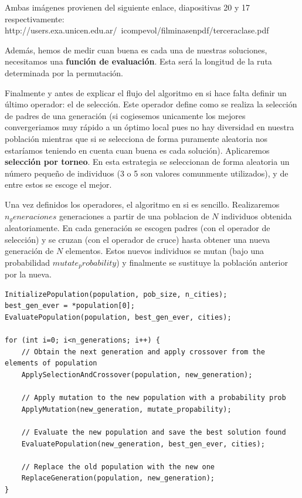 \documentclass{article}
\begin{document}
Ambas imágenes provienen del siguiente enlace, diapositivas 20 y 17 respectivamente:
http://users.exa.unicen.edu.ar/~icompevol/filminasenpdf/terceraclase.pdf

Además, hemos de medir cuan buena es cada una de nuestras soluciones,
necesitamos una \textbf{función de evaluación}. Esta será la longitud
de la ruta determinada por la permutación.

Finalmente y antes de explicar el flujo del algoritmo en si hace falta
definir un último operador: el de selección. Este operador define como
se realiza la selección de padres de una generación (si cogiesemos
unicamente los mejores convergeriamos muy rápido a un óptimo local
pues no hay diversidad en nuestra población mientras que si se
selecciona de forma puramente aleatoria nos estaríamos teniendo en
cuenta cuan buena es cada solución). Aplicaremos \textbf{selección por
  torneo}. En esta estrategia se seleccionan de forma aleatoria un
número pequeño de individuos (3 o 5 son valores comunmente
utilizados), y de entre estos se escoge el mejor.

Una vez definidos los operadores, el algoritmo en si es
sencillo. Realizaremos $n_generaciones$ generaciones a partir de una
poblacion de $N$ individuos obtenida aleatoriamente. En cada
generación se escogen padres (con el operador de selección) y se
cruzan (con el operador de cruce) hasta obtener una nueva generación
de $N$ elementos. Estos nuevos individuos se mutan (bajo una
probabilidad $mutate_probability$) y finalmente se sustituye la
población anterior por la nueva.

\begin{lstlisting}
InitializePopulation(population, pob_size, n_cities);
best_gen_ever = *population[0];
EvaluatePopulation(population, best_gen_ever, cities);

for (int i=0; i<n_generations; i++) {
	// Obtain the next generation and apply crossover from the elements of population
	ApplySelectionAndCrossover(population, new_generation);
	
	// Apply mutation to the new population with a probability prob
	ApplyMutation(new_generation, mutate_propability);
	
	// Evaluate the new population and save the best solution found
	EvaluatePopulation(new_generation, best_gen_ever, cities);
	
	// Replace the old population with the new one
	ReplaceGeneration(population, new_generation);
}
\end{lstlisting}
\end{document}
